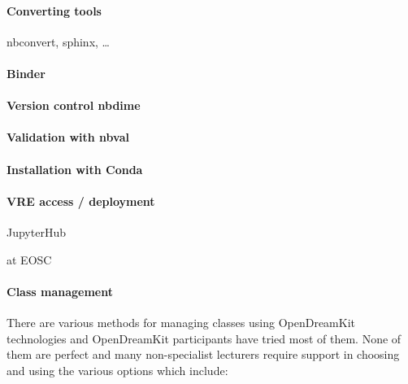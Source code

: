 \documentclass{deliverablereport}
\begin{document}
\hypertarget{converting-tools}{%
\paragraph{Converting tools}\label{converting-tools}}

nbconvert, sphinx, \ldots{}

\hypertarget{binder}{%
\paragraph{Binder}\label{binder}}

\hypertarget{version-control-nbdime}{%
\paragraph{Version control nbdime}\label{version-control-nbdime}}

\hypertarget{validation-with-nbval}{%
\paragraph{Validation with nbval}\label{validation-with-nbval}}

\hypertarget{installation-with-conda}{%
\paragraph{Installation with Conda}\label{installation-with-conda}}

\hypertarget{vre-access-deployment}{%
\paragraph{VRE access / deployment}\label{vre-access-deployment}}

JupyterHub

at EOSC

\hypertarget{class-management}{%
\paragraph{Class management}\label{class-management}}

There are various methods for managing classes using OpenDreamKit
technologies and OpenDreamKit participants have tried most of them. None
of them are perfect and many non-specialist lecturers require support in
choosing and using the various options which include:
\end{document}
